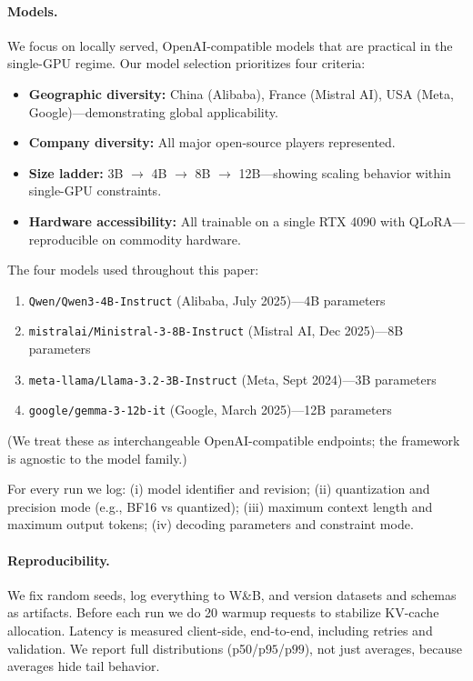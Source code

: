 \documentclass[11pt]{article}
\newcommand{\pninetyfive}{\ensuremath{\mathrm{p95}}}
\newcommand{\pninetynine}{\ensuremath{\mathrm{p99}}}
\begin{document}
\paragraph{Models.}
We focus on locally served, OpenAI-compatible models that are practical in the single-GPU regime.
Our model selection prioritizes four criteria:
\begin{itemize}[leftmargin=12pt,itemsep=2pt]
    \item \textbf{Geographic diversity:} China (Alibaba), France (Mistral AI), USA (Meta, Google)---demonstrating global applicability.
    \item \textbf{Company diversity:} All major open-source players represented.
    \item \textbf{Size ladder:} 3B $\rightarrow$ 4B $\rightarrow$ 8B $\rightarrow$ 12B---showing scaling behavior within single-GPU constraints.
    \item \textbf{Hardware accessibility:} All trainable on a single RTX 4090 with QLoRA---reproducible on commodity hardware.
\end{itemize}

\noindent The four models used throughout this paper:
\begin{enumerate}[leftmargin=12pt,itemsep=1pt]
    \item \texttt{Qwen/Qwen3-4B-Instruct} (Alibaba, July 2025)---4B parameters
    \item \texttt{mistralai/Ministral-3-8B-Instruct} (Mistral AI, Dec 2025)---8B parameters
    \item \texttt{meta-llama/Llama-3.2-3B-Instruct} (Meta, Sept 2024)---3B parameters
    \item \texttt{google/gemma-3-12b-it} (Google, March 2025)---12B parameters
\end{enumerate}
(We treat these as interchangeable OpenAI-compatible endpoints; the framework is agnostic to the model family.)

For every run we log:
(i) model identifier and revision;
(ii) quantization and precision mode (e.g., BF16 vs quantized);
(iii) maximum context length and maximum output tokens;
(iv) decoding parameters and constraint mode.

\paragraph{Reproducibility.}
We fix random seeds, log everything to W\&B, and version datasets and schemas as artifacts.
Before each run we do 20 warmup requests to stabilize KV-cache allocation.
Latency is measured client-side, end-to-end, including retries and validation.
We report full distributions (p50/\pninetyfive/\pninetynine), not just averages, because averages hide tail behavior.
\end{document}
